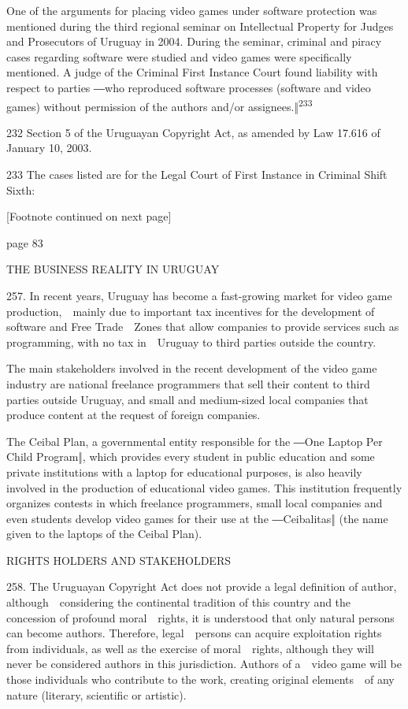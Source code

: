 \documentclass[
]{article}
\begin{document}
{One of the arguments for placing video games under software protection
was mentioned during the third regional seminar on Intellectual Property
for Judges and Prosecutors of Uruguay in 2004. During the seminar,
criminal and piracy cases regarding software were studied and video
games were specifically mentioned. A judge of the Criminal First
Instance Court found liability with respect to parties }{―who reproduced
software processes (software and video games) without permission of the
authors and/or assignees.‖}\textsuperscript{{233}}

{232 }{Section 5 of the Uruguayan }{Copyright Act}{, as amended by Law
17.616 of January 10, 2003.}

{233 }{The cases listed are for the Legal Court of First Instance in
Criminal Shift Sixth:}

{{[}Footnote continued on next page{]}}

{page 83}

{THE BUSINESS REALITY IN URUGUAY}

{257. }{In recent years, Uruguay has become a fast-growing market for
video game production,~~mainly due to important tax incentives for the
development of software and Free Trade~~Zones that allow companies to
provide services such as programming, with no tax in~~Uruguay to third
parties outside the country.}

{The main stakeholders involved in the recent development of the video
game industry are national freelance programmers that sell their content
to third parties outside Uruguay, and small and medium-sized local
companies that produce content at the request of foreign companies.}

{The Ceibal Plan, a governmental entity responsible for the ―One Laptop
Per Child Program‖, which provides every student in public education and
some private institutions }{with a laptop for educational purposes, is
also heavily involved in the production of educational video games. This
institution frequently organizes contests in which freelance
programmers, small local companies and even students develop video games
for their }{use at the ―Ceibalitas‖ (the name given }{to the laptops of
the Ceibal Plan).}

{RIGHTS HOLDERS AND STAKEHOLDERS}

{258. }{The Uruguayan }{Copyright Act }{does not provide a legal
definition of }{author}{, although~~considering the continental
tradition of this country and the concession of profound moral~~rights,
it is understood that only natural persons can become authors.
Therefore, legal~~persons can acquire exploitation rights from
individuals, as well as the exercise of moral~~rights, although they
will never be considered }{authors }{in this jurisdiction. Authors of
a~~video game will be those individuals who contribute to the work,
creating original elements~~of any nature (literary, scientific or
artistic).}
\end{document}
